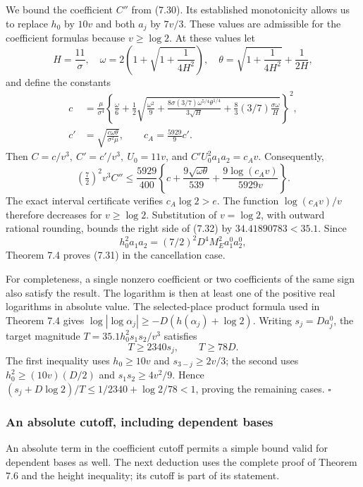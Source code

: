 \documentclass[
  11pt,
  a4paper,
]{article}
\begin{document}
We bound the coefficient \(C''\) from (7.30). Its established
monotonicity allows us to replace \(h_0\) by \(10v\) and both \(a_j\) by
\(7v/3\). These values are admissible for the coefficient formulas
because \(v\ge\log2\). At these values let \[
H=\frac{11}{\sigma},\quad
\omega=2\left(1+\sqrt{1+\frac1{4H^2}}\right),\quad
\theta=\sqrt{1+\frac1{4H^2}}+\frac1{2H},
\] and define the constants \[
\begin{aligned}
c&=\frac{\mu}{\sigma^4}
\left\{\frac{\omega}{6}
+\frac12\sqrt{\frac{\omega^2}{9}
+\frac{8\sigma(3/7)\omega^{5/4}\theta^{1/4}}{3\sqrt H}
+\frac83(3/7)\frac{\sigma\omega}{H}}\right\}^{\!2},\\
c'&=\sqrt{\frac{c\omega\theta}{\sigma^2\mu}},\qquad
c_A=\frac{5929}{9}c'.
\end{aligned}
\] Then \(C=c/v^3,\ C'=c'/v^3,\ U_0=11v\), and \(C'U_0^2a_1a_2=c_Av\).
Consequently, \[
\left(\tfrac72\right)^2v^3C''
\le \frac{5929}{400}
\left\{c+\frac{9\sqrt{\omega\theta}}{539}
+\frac{9\log(c_Av)}{5929v}\right\}. \tag{7.32}
\] The exact interval certificate verifies \(c_A\log2>e\). The function
\(\log(c_Av)/v\) therefore decreases for \(v\ge\log2\). Substitution of
\(v=\log2\), with outward rational rounding, bounds the right side of
(7.32) by \(34.41890783<35.1\). Since \[
h_0^2a_1a_2=(7/2)^2D^4M_E^2a_1^0a_2^0,
\] Theorem 7.4 proves (7.31) in the cancellation case.

For completeness, a single nonzero coefficient or two coefficients of
the same sign also satisfy the result. The logarithm is then at least
one of the positive real logarithms in absolute value. The
selected-place product formula used in Theorem 7.4 gives
\(\log|\log\alpha_j|\ge-D(h(\alpha_j)+\log2)\). Writing \(s_j=Da_j^0\),
the target magnitude \(T=35.1h_0^2s_1s_2/v^3\) satisfies \[
T\ge2340s_j,\qquad T\ge78D.
\] The first inequality uses \(h_0\ge10v\) and \(s_{3-j}\ge2v/3\); the
second uses \(h_0^2\ge(10v)(D/2)\) and \(s_1s_2\ge4v^2/9\). Hence
\((s_j+D\log2)/T\le1/2340+\log2/78<1\), proving the remaining cases.
\(\square\)

\subsubsection{An absolute cutoff, including dependent
bases}\label{an-absolute-cutoff-including-dependent-bases}

An absolute term in the coefficient cutoff permits a simple bound valid
for dependent bases as well. The next deduction uses the complete proof
of Theorem 7.6 and the height inequality; its cutoff is part of its
statement.
\end{document}
